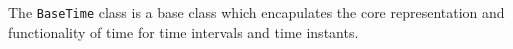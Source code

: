 
The {\tt BaseTime} class is a base class which encapulates the core
representation and functionality of time for time intervals and time
instants.
